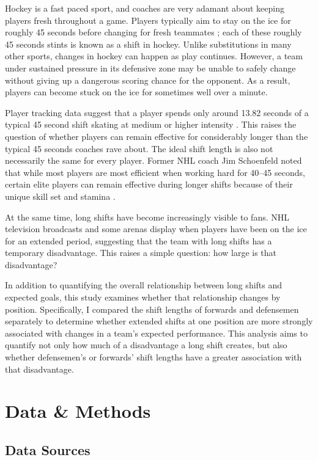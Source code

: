 \documentclass[
  12pt]{article}
\begin{document}
Hockey is a fast paced sport, and coaches are very adamant about keeping
players fresh throughout a game. Players typically aim to stay on the
ice for roughly 45 seconds before changing for fresh teammates
\citep{lyonsHockey45Seconds}; each of these roughly 45 seconds stints is
known as a shift in hockey. Unlike substitutions in many other sports,
changes in hockey can happen as play continues. However, a team under
sustained pressure in its defensive zone may be unable to safely change
without giving up a dangerous scoring chance for the opponent. As a
result, players can become stuck on the ice for sometimes well over a
minute.

Player tracking data suggest that a player spends only around 13.82
seconds of a typical 45 second shift skating at medium or higher
intensity \citep{lyonsHockey45Seconds}. This raises the question of
whether players can remain effective for considerably longer than the
typical 45 seconds coaches rave about. The ideal shift length is also
not necessarily the same for every player. Former NHL coach Jim
Schoenfeld noted that while most players are most efficient when working
hard for 40--45 seconds, certain elite players can remain effective
during longer shifts because of their unique skill set and stamina
\citep{schoenfeld2002}.

At the same time, long shifts have become increasingly visible to fans.
NHL television broadcasts and some arenas display when players have been
on the ice for an extended period, suggesting that the team with long
shifts has a temporary disadvantage. This raises a simple question: how
large is that disadvantage?

In addition to quantifying the overall relationship between long shifts
and expected goals, this study examines whether that relationship
changes by position. Specifically, I compared the shift lengths of
forwards and defensemen separately to determine whether extended shifts
at one position are more strongly associated with changes in a team's
expected performance. This analysis aims to quantify not only how much
of a disadvantage a long shift creates, but also whether defensemen's or
forwards' shift lengths have a greater association with that
disadvantage.

\section{Data \& Methods}\label{sec-data-methods}

\subsection{Data Sources}\label{data-sources}
\end{document}
